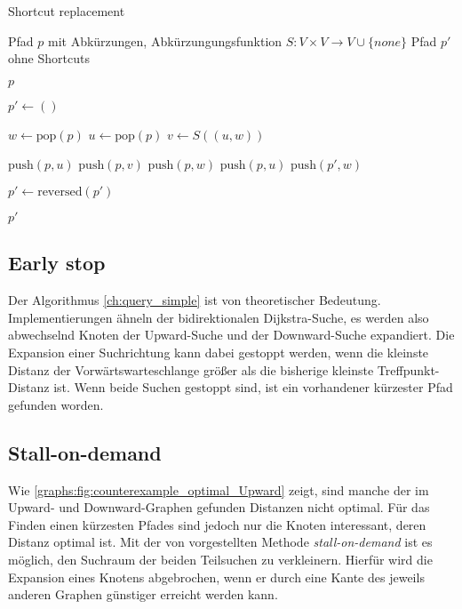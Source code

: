 \begin{algorithm}[ht]
  \caption{Shortcut replacement}
  \begin{algorithmic}[1]
    \Require Pfad $p$ mit Abkürzungen, Abkürzungungsfunktion $S \colon V \times V \to V \cup \{ {none} \}$
    \Ensure Pfad $p'$ ohne Shortcuts

    \State \Return $p$
    \EndIf
    \State

    \State $p' \leftarrow ()$
    \State

    \State $w \leftarrow \text{pop}(p)$
    \State $u \leftarrow \text{pop}(p)$
    \State $v \leftarrow S((u, w))$
    \State

    \State $\text{push}(p, u)$
    \State $\text{push}(p, v)$
    \State $\text{push}(p, w)$
    \Else
    \State $\text{push}(p, u)$
    \State $\text{push}(p', w)$
    \EndIf
    \EndWhile

    \State
    \State $p' \leftarrow \text{reversed}(p')$

    \State
    \State \Return $p'$
  \end{algorithmic}
  \label{ch:alg:shortcut_replacement}
\end{algorithm}

\subsection{Early stop}

Der Algorithmus \ref{ch:query_simple} ist von theoretischer Bedeutung.
Implementierungen ähneln der bidirektionalen Dijkstra-Suche, es werden also abwechselnd Knoten der Upward-Suche und der Downward-Suche expandiert.
Die Expansion einer Suchrichtung kann dabei gestoppt werden, wenn die kleinste Distanz der Vorwärtswarteschlange größer als die bisherige kleinste Treffpunkt-Distanz ist.
Wenn beide Suchen gestoppt sind, ist ein vorhandener kürzester Pfad gefunden worden.

\subsection{Stall-on-demand}

Wie \autoref{graphs:fig:counterexample_optimal_Upward} zeigt, sind manche der im Upward- und Downward-Graphen gefunden Distanzen nicht optimal.
Für das Finden einen kürzesten Pfades sind jedoch nur die Knoten interessant, deren Distanz optimal ist.
Mit der von \cite{schultes2007dynamic} vorgestellten Methode \emph{stall-on-demand} ist es möglich, den Suchraum der beiden Teilsuchen zu verkleinern.
Hierfür wird die Expansion eines Knotens abgebrochen, wenn er durch eine Kante des jeweils anderen Graphen günstiger erreicht werden kann.

